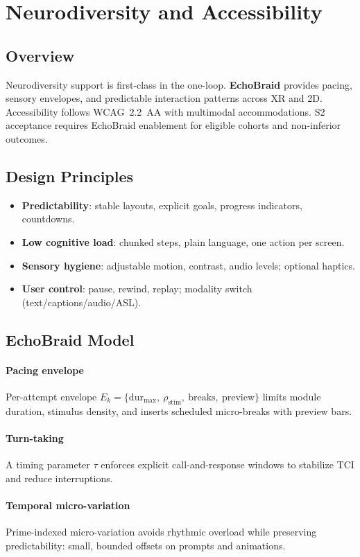 \documentclass[11pt]{article}
\theoremstyle{plain}
\begin{document}
\section{Neurodiversity and Accessibility}

\subsection{Overview}
Neurodiversity support is first-class in the one-loop. \textbf{EchoBraid} provides pacing, sensory envelopes, and predictable interaction patterns across XR and 2D. Accessibility follows WCAG~2.2~AA with multimodal accommodations. S2 acceptance requires EchoBraid enablement for eligible cohorts and non-inferior outcomes.

\subsection{Design Principles}
\begin{itemize}
  \item \textbf{Predictability}: stable layouts, explicit goals, progress indicators, countdowns.
  \item \textbf{Low cognitive load}: chunked steps, plain language, one action per screen.
  \item \textbf{Sensory hygiene}: adjustable motion, contrast, audio levels; optional haptics.
  \item \textbf{User control}: pause, rewind, replay; modality switch (text/captions/audio/ASL).
\end{itemize}

\subsection{EchoBraid Model}
\paragraph{Pacing envelope}
Per-attempt envelope $E_k=\{\text{dur}_{\max},\ \rho_{\text{stim}},\ \text{breaks},\ \text{preview}\}$ limits module duration, stimulus density, and inserts scheduled micro-breaks with preview bars.
\paragraph{Turn-taking}
A timing parameter $\tau$ enforces explicit call-and-response windows to stabilize TCI and reduce interruptions.
\paragraph{Temporal micro-variation}
Prime-indexed micro-variation avoids rhythmic overload while preserving predictability: small, bounded offsets on prompts and animations.
\end{document}
